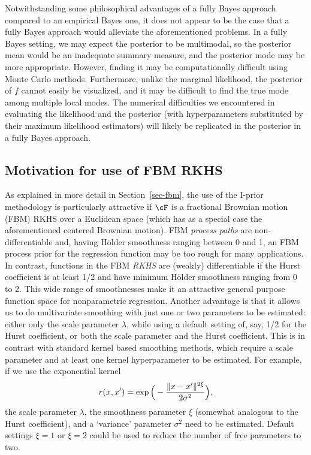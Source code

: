 \documentclass[preprint,12pt,authoryear]{elsarticle}
\DeclarePairedDelimiter{\norm}{\lVert}{\rVert}
\begin{document}
Notwithstanding some philosophical advantages of a fully Bayes approach compared to an empirical Bayes one, it does not appear to be the case that a fully Bayes approach would alleviate the aforementioned problems. In a fully Bayes setting, we may expect the posterior to be multimodal, so the posterior mean would be an inadequate summary measure, and the posterior mode may be more appropriate. However, finding it may be computationally difficult using Monte Carlo methods. Furthermore, unlike the marginal likelihood, the posterior of $f$ cannot easily be visualized, and it may be difficult to find the true mode among multiple local modes. The numerical difficulties we encountered in evaluating the likelihood and the posterior (with hyperparameters substituted by their maximum likelihood estimators) will likely be replicated in the posterior in a fully Bayes approach.



\subsection{Motivation for use of FBM RKHS}

As explained in more detail in Section~\ref{sec-fbm}, the use of the I-prior methodology is particularly attractive if $\cF$ is a fractional Brownian motion (FBM) RKHS over a Euclidean space (which has as a special case the aforementioned centered Brownian motion). FBM {\em process paths} are non-differentiable and, having H\"older smoothness ranging between 0 and 1, an FBM process prior for the regression function may be too rough for many applications. 
In contrast, functions in the FBM {\em RKHS} are (weakly) differentiable if the Hurst coefficient is at least 1/2 and have minimum H\"older smoothness ranging from 0 to 2. This wide range of smoothnesses make it an attractive general purpose function space for nonparametric regression. 
Another advantage is that it allows us to do multivariate smoothing with just one or two parameters to be estimated: either only the scale parameter $\lambda$, while using a default setting of, say, 1/2 for the Hurst coefficient, or both the scale parameter and the Hurst coefficient. This is in contrast with standard kernel based smoothing methods, which require a scale parameter and at least one kernel hyperparameter to be estimated. For example, if we use the exponential kernel
\begin{equation}\label{sqexp}
r(x,x') = \exp\Big(-\frac{\norm{x-x'}^{2\xi}}{2\sigma^2}\Big), 
\end{equation}
the scale parameter $\lambda$, the smoothness parameter $\xi$ (somewhat analogous to the Hurst coefficient), and a `variance' parameter $\sigma^2$ need to be estimated. Default settings $\xi=1$ or $\xi=2$ could be used to reduce the number of free parameters to two. 
\end{document}
